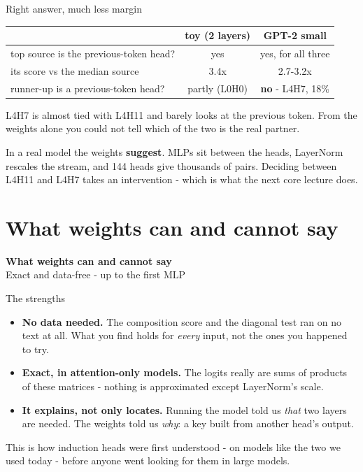 \documentclass[aspectratio=169]{beamer}
\newcommand{\keybox}[1]{%
  \begin{tcolorbox}[colback=armblue!8, colframe=armblue, boxrule=0.6pt, arc=2pt]
  #1
  \end{tcolorbox}}
\newcommand{\watchbox}[1]{%
  \begin{tcolorbox}[colback=armorange!12, colframe=armorange, boxrule=0.6pt, arc=2pt]
  #1
  \end{tcolorbox}}
\newcommand{\sectiontransition}[2]{%
  \begin{frame}[plain]
    \vfill
    \begin{center}
      {\Huge\bfseries\color{popblue} #1}\\[1.1em]
      {\large #2}
    \end{center}
    \vfill
  \end{frame}}
\begin{document}
\begin{frame}{Right answer, much less margin}
  \vspace{0.5em}
  \begin{center}
  \small
  \begin{tabular}{@{}lcc@{}}
    \toprule
    & \textbf{toy (2 layers)} & \textbf{GPT-2 small}\\
    \midrule
    top source is the previous-token head? & yes & yes, for all three\\
    its score vs the median source & 3.4x & 2.7-3.2x\\
    runner-up is a previous-token head? & partly (L0H0) & \textbf{no} - L4H7, 18\%\\
    \bottomrule
  \end{tabular}
  \end{center}

  \vspace{0.6em}
  L4H7 is almost tied with L4H11 and barely looks at the previous token. From the weights alone you
  could not tell which of the two is the real partner.

  \vspace{0.5em}
  \watchbox{\small In a real model the weights \textbf{suggest}. MLPs sit between the heads,
  LayerNorm rescales the stream, and 144 heads give thousands of pairs. Deciding between L4H11 and
  L4H7 takes an intervention - which is what the next core lecture does.}
\end{frame}

\section{What weights can and cannot say}
\sectiontransition{What weights can and cannot say}{Exact and data-free - up to the first MLP}

\begin{frame}{The strengths}
  \vspace{0.6em}
  \begin{itemize}
    \item \textbf{No data needed.} The composition score and the diagonal test ran on no text at
      all. What you find holds for \emph{every} input, not the ones you happened to try.
    \item \textbf{Exact, in attention-only models.} The logits really are sums of products of these
      matrices - nothing is approximated except LayerNorm's scale.
    \item \textbf{It explains, not only locates.} Running the model told us \emph{that} two layers
      are needed. The weights told us \emph{why}: a key built from another head's output.
  \end{itemize}

  \vspace{0.6em}
  \keybox{\small This is how induction heads were first understood - on models like the two we used
  today - before anyone went looking for them in large models.}
\end{frame}
\end{document}
